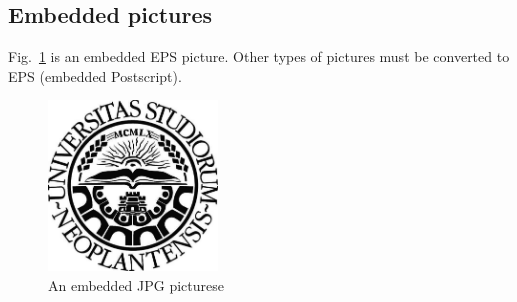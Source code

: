 \documentclass[a4paper,12pt]{article}
\begin{document}
\subsection{Embedded pictures}\label{sec:pictures}

Fig.~\ref{fig:mypicture1} is an embedded EPS picture. Other types of pictures must be converted to EPS (embedded Postscript).

\begin{figure}[t]
  \begin{center}
    \includegraphics[width=0.4\textwidth,height=0.4\textheight,keepaspectratio]{NoviSadLogoGray.jpg}
    \caption{An embedded JPG picturese }
    \label{fig:mypicture1}
  \end{center}
\end{figure}


\clearpage
%

 
%
\end{document}
